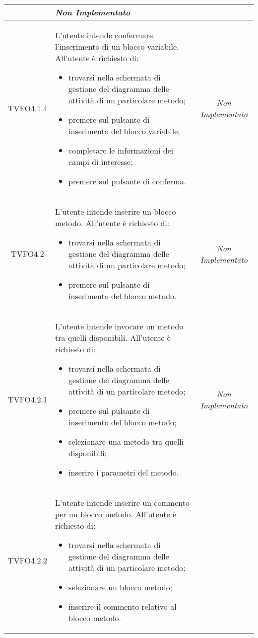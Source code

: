 \begin{longtable}{|c|>{}m{8cm}|c|}
\begin{itemize}
\end{itemize} & \textit{Non Implementato}\\ \hline
\hypertarget{TVFO4.1.4}{TVFO4.1.4} & L'utente intende confermare l'inserimento di un blocco variabile.
All'utente è richiesto di:
\begin{itemize}
	\item trovarsi nella schermata di gestione del diagramma delle attività di un particolare metodo;
	\item premere sul pulsante di inserimento del blocco variabile;
	\item completare le informazioni dei campi di interesse;
	\item premere sul pulsante di conferma.
\end{itemize} & \textit{Non Implementato}\\ \hline
\hypertarget{TVFO4.2}{TVFO4.2} & L'utente intende inserire un blocco metodo.
All'utente è richiesto di:
\begin{itemize}
	\item trovarsi nella schermata di gestione del diagramma delle attività di un particolare metodo;
	\item premere sul pulsante di inserimento del blocco metodo.
\end{itemize} & \textit{Non Implementato}\\ \hline
\hypertarget{TVFO4.2.1}{TVFO4.2.1} & L'utente intende invocare un metodo tra quelli disponibili.
All'utente è richiesto di:
\begin{itemize}
	\item trovarsi nella schermata di gestione del diagramma delle attività di un particolare metodo;
	\item premere sul pulsante di inserimento del blocco metodo;
	\item selezionare una metodo tra quelli disponibili;
	\item inserire i parametri del metodo.
\end{itemize} & \textit{Non Implementato}\\ \hline
\hypertarget{TVFO4.2.2}{TVFO4.2.2} & L'utente intende inserire un commento per un blocco metodo.
All'utente è richiesto di:
\begin{itemize}
	\item trovarsi nella schermata di gestione del diagramma delle attività di un particolare metodo;
	\item selezionare un blocco metodo;
	\item inserire il commento relativo al blocco metodo.

\end{itemize}
\end{longtable}
